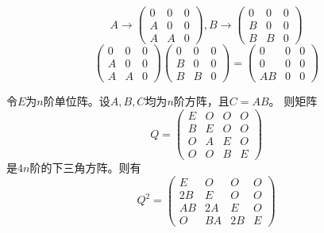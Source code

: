 \begin{questions}
    \begin{solution}
        $$A \rightarrow
            \left(
            \begin{array}{ccc}
                    0 & 0 & 0 \\
                    A & 0 & 0 \\
                    A & A & 0
                \end{array}
            \right), B \rightarrow
            \left(
            \begin{array}{ccc}
                    0 & 0 & 0 \\
                    B & 0 & 0 \\
                    B & B & 0
                \end{array}
            \right)
        $$
        \[
            \left(
            \begin{array}{ccc}
                    0 & 0 & 0 \\
                    A & 0 & 0 \\
                    A & A & 0
                \end{array}
            \right)
            \left(
            \begin{array}{ccc}
                    0 & 0 & 0 \\
                    B & 0 & 0 \\
                    B & B & 0
                \end{array}
            \right)=
            \left(
            \begin{array}{ccc}
                    0   & 0 & 0 \\
                    0   & 0 & 0 \\
                    A B & 0 & 0
                \end{array}
            \right)
        \]
    \end{solution}

    \begin{solution}
        令$E$为$n$阶单位阵。设$A,B,C$均为$n$阶方阵，且$C = AB$。
        则矩阵\[
            Q = \begin{pmatrix}
                E & O & O & O \\
                B & E & O & O \\
                O & A & E & O \\
                O & O & B & E
            \end{pmatrix}
        \]是$4n$阶的下三角方阵。则有
        \[
            Q^2 = \begin{pmatrix}
                E  & O  & O  & O \\
                2B & E  & O  & O \\
                AB & 2A & E  & O \\
                O  & BA & 2B & E
            \end{pmatrix}
        \]


\end{solution}
\end{questions}
